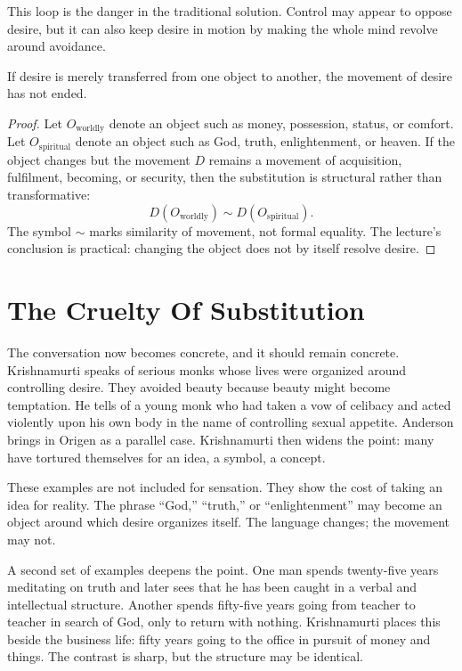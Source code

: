 This loop is the danger in the traditional solution. Control may appear to oppose desire, but it can also keep desire in motion by making the whole mind revolve around avoidance.

\begin{proposition}
If desire is merely transferred from one object to another, the movement of desire has not ended.
\end{proposition}

\begin{proof}
Let \(O_{\mathrm{worldly}}\) denote an object such as money, possession, status, or comfort. Let \(O_{\mathrm{spiritual}}\) denote an object such as God, truth, enlightenment, or heaven. If the object changes but the movement \(D\) remains a movement of acquisition, fulfilment, becoming, or security, then the substitution is structural rather than transformative:
\begin{equation}
D(O_{\mathrm{worldly}})
\sim
D(O_{\mathrm{spiritual}}).
\end{equation}
The symbol \(\sim\) marks similarity of movement, not formal equality. The lecture's conclusion is practical: changing the object does not by itself resolve desire.
\end{proof}

\section{The Cruelty Of Substitution}

The conversation now becomes concrete, and it should remain concrete. Krishnamurti speaks of serious monks whose lives were organized around controlling desire. They avoided beauty because beauty might become temptation. He tells of a young monk who had taken a vow of celibacy and acted violently upon his own body in the name of controlling sexual appetite. Anderson brings in Origen as a parallel case. Krishnamurti then widens the point: many have tortured themselves for an idea, a symbol, a concept.

These examples are not included for sensation. They show the cost of taking an idea for reality. The phrase ``God,'' ``truth,'' or ``enlightenment'' may become an object around which desire organizes itself. The language changes; the movement may not.

A second set of examples deepens the point. One man spends twenty-five years meditating on truth and later sees that he has been caught in a verbal and intellectual structure. Another spends fifty-five years going from teacher to teacher in search of God, only to return with nothing. Krishnamurti places this beside the business life: fifty years going to the office in pursuit of money and things. The contrast is sharp, but the structure may be identical.

